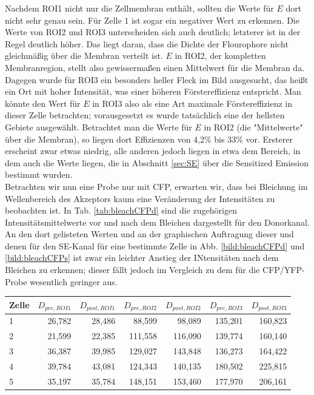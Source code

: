 Nachdem ROI1 nicht nur die Zellmembran enthält, sollten die Werte für $E$ dort nicht sehr genau sein. Für Zelle 1 ist sogar ein negativer Wert 
zu erkennen. Die Werte von ROI2 und ROI3 unterscheiden sich auch deutlich; letzterer ist in der Regel deutlich höher. Das liegt daran, 
dass die Dichte der Flourophore nicht gleichmäßig über die Membran verteilt ist. $E$ in ROI2, der kompletten Membranregion, stellt also 
gewissermaßen einen Mittelwert für die Membran da. Dagegen wurde für ROI3 ein besonders heller Fleck im Bild ausgesucht, das heißt ein 
Ort mit hoher Intensität, was einer höheren Förstereffizienz entspricht. Man könnte den Wert für $E$ in ROI3 also als eine Art 
maximale Förstereffizienz in dieser Zelle betrachten; vorausgesetzt es wurde tatsächlich eine der hellsten Gebiete ausgewählt. 
Betrachtet man die Werte für $E$ in ROI2 (die "Mittelwerte" über die Membran), so liegen dort Effizienzen von 4,2\% bis 33\% vor. Ersterer 
erscheint zwar etwas niedrig, alle anderen jedoch liegen in etwa dem Bereich, in dem auch die Werte liegen, die in Abschnitt \ref{sec:SE} 
über die Sensitized Emission bestimmt wurden.\\
Betrachten wir nun eine Probe nur mit CFP, erwarten wir, dass bei Bleichung im Wellenbereich des Akzeptors kaum eine Veränderung der 
Intensitäten zu beobachten ist. In Tab. \ref{tab:bleachCFPd} sind die zugehörigen Intensitätsmittelwerte 
vor und nach dem Bleichen dargestellt für den Donorkanal. An den dort gelisteten Werten und an der graphischen Auftragung 
dieser und denen für den SE-Kanal für eine bestimmte Zelle in Abb. \ref{bild:bleachCFPd} und \ref{bild:bleachCFPs} ist zwar ein leichter Anstieg der INtensitäten 
nach dem Bleichen zu erkennen; dieser fällt jedoch im Vergleich zu dem für die CFP/YFP-Probe wesentlich geringer aus.

\begin{center}
    \centering
    \begin{tabular}{lrrrrrr}
        \toprule
        Zelle &   $D_{pre,ROI1}$ &  $D_{post,ROI1}$ &   $D_{pre,ROI2}$ &  $D_{post,ROI2}$ &    $D_{pre,ROI3}$ &   $D_{post,ROI3}$ \\ 
        \midrule
        1 & 26,782 & 28,486 &  88,599 &  98,089 & 135,201 & 160,823 \\
        2 & 21,599 & 22,385 & 111,558 & 116,090 & 139,774 & 160,140 \\
        3 & 36,387 & 39,985 & 129,027 & 143,848 & 136,273 & 164,422 \\
        4 & 39,784 & 43,081 & 124,343 & 140,135 & 180,502 & 225,815 \\
        5 & 35,197 & 35,784 & 148,151 & 153,460 & 177,970 & 206,161 \\
        \bottomrule
    \end{tabular}
    \label{tab:bleachCFPd}
\end{center}

